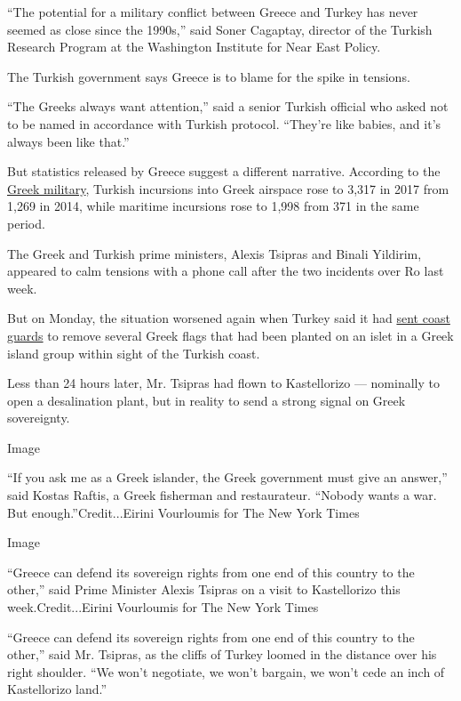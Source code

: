 ``The potential for a military conflict between Greece and Turkey has
never seemed as close since the 1990s,'' said Soner Cagaptay, director
of the Turkish Research Program at the Washington Institute for Near
East Policy.

The Turkish government says Greece is to blame for the spike in
tensions.

``The Greeks always want attention,'' said a senior Turkish official who
asked not to be named in accordance with Turkish protocol. ``They're
like babies, and it's always been like that.''

But statistics released by Greece suggest a different narrative.
According to the
\href{http://www.geetha.mil.gr/el/violations-gr.html}{Greek military},
Turkish incursions into Greek airspace rose to 3,317 in 2017 from 1,269
in 2014, while maritime incursions rose to 1,998 from 371 in the same
period.

The Greek and Turkish prime ministers, Alexis Tsipras and Binali
Yildirim, appeared to calm tensions with a phone call after the two
incidents over Ro last week.

But on Monday, the situation worsened again when Turkey said it had
\href{https://www.nytimes3xbfgragh.onion/reuters/2018/04/16/world/europe/16reuters-turkey-greece.html}{sent
coast guards} to remove several Greek flags that had been planted on an
islet in a Greek island group within sight of the Turkish coast.

Less than 24 hours later, Mr. Tsipras had flown to Kastellorizo ---
nominally to open a desalination plant, but in reality to send a strong
signal on Greek sovereignty.

Image

``If you ask me as a Greek islander, the Greek government must give an
answer,'' said Kostas Raftis, a Greek fisherman and restaurateur.
``Nobody wants a war. But enough.''Credit...Eirini Vourloumis for The
New York Times

Image

``Greece can defend its sovereign rights from one end of this country to
the other,'' said Prime Minister Alexis Tsipras on a visit to
Kastellorizo this week.Credit...Eirini Vourloumis for The New York Times

``Greece can defend its sovereign rights from one end of this country to
the other,'' said Mr. Tsipras, as the cliffs of Turkey loomed in the
distance over his right shoulder. ``We won't negotiate, we won't
bargain, we won't cede an inch of Kastellorizo land.''

